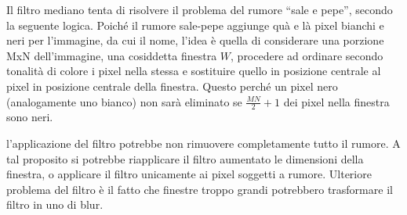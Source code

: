 \documentclass{subfiles}
\begin{document}
Il filtro mediano tenta di risolvere il problema del rumore ``sale e pepe'', secondo la seguente logica.
Poiché il rumore sale-pepe aggiunge quà e là pixel bianchi e neri per l'immagine, da cui il nome,
l'idea è quella di considerare una porzione MxN dell'immagine, una cosiddetta finestra $W$,
procedere ad ordinare secondo tonalità di colore i pixel nella stessa e sostituire quello in posizione centrale al pixel in posizione centrale della finestra.
Questo perché un pixel nero (analogamente uno bianco) non sarà eliminato se $\tfrac{MN}{2} + 1$ dei pixel nella finestra sono neri.


\begin{Remark*}
    l'applicazione del filtro potrebbe non rimuovere completamente tutto il rumore.
    A tal proposito si potrebbe riapplicare il filtro aumentato le dimensioni della finestra, o applicare il filtro unicamente ai pixel soggetti a rumore.
    Ulteriore problema del filtro è il fatto che finestre troppo grandi potrebbero trasformare il filtro in uno di blur.
\end{Remark*}
\end{document}

